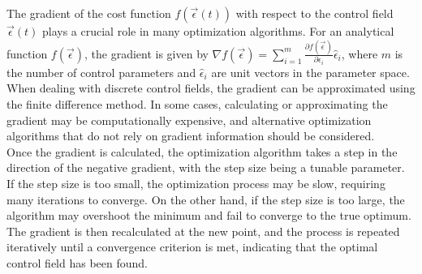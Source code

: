 \documentclass[12pt]{report}
\begin{document}
The gradient of the cost function $f(\vec{\epsilon}(t))$ with respect to the control field $\vec{\epsilon}(t)$ plays a crucial role in many optimization algorithms. 
For an analytical function $f(\vec{\epsilon})$, the gradient is given by $\nabla f(\vec{\epsilon}) = \sum_{i=1}^m \frac{\partial f(\vec{\epsilon})}{\partial \epsilon_i} \hat{\epsilon}_i$, where $m$ is the number of control parameters and $\hat{\epsilon}_i$ are unit vectors in the parameter space. 
When dealing with discrete control fields, the gradient can be approximated using the finite difference method. In some cases, calculating or approximating the gradient may be computationally expensive, and alternative optimization algorithms that do not rely on gradient information should be considered.
\\
Once the gradient is calculated, the optimization algorithm takes a step in the direction of the negative gradient, with the step size being a tunable parameter. 
If the step size is too small, the optimization process may be slow, requiring many iterations to converge. 
On the other hand, if the step size is too large, the algorithm may overshoot the minimum and fail to converge to the true optimum. 
The gradient is then recalculated at the new point, and the process is repeated iteratively until a convergence criterion is met, indicating that the optimal control field has been found.

\end{document}
